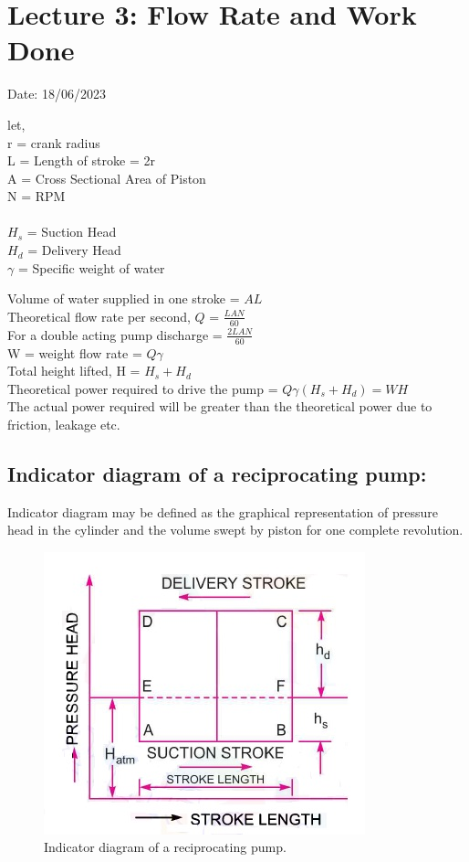 \documentclass{article}
\begin{document}
\section{Lecture 3: Flow Rate and Work Done}
\hfill Date: 18/06/2023

\begin{multicols}{2}
  let, \\
  r = crank radius \\
  L = Length of stroke = 2r \\ 
  A = Cross Sectional Area of Piston \\
  N = RPM \\
  \\
  $H_s$ = Suction Head \\
  $H_d$ = Delivery Head \\
  $\gamma$ = Specific weight of water \\
\end{multicols}

Volume of water supplied in one stroke = $AL$ \\
Theoretical flow rate per second, $Q$ = $\frac{LAN}{60}$ \\
For a double acting pump discharge = $\frac{2LAN}{60}$ \\
W = weight flow rate = $Q\gamma$ \\
Total height lifted, H = $H_s + H_d$ \\
Theoretical power required to drive the pump = $Q \gamma \left(H_s + H_d\right) = WH$\\
The actual power required will be greater than the theoretical power due to friction, leakage etc.

\subsection*{Indicator diagram of a reciprocating pump:}
Indicator diagram may be defined as the graphical representation of pressure head in the cylinder and the volume swept by piston for one complete revolution.  
\begin{figure}[h]
  \begin{center}
    \includegraphics[width=0.7\linewidth]{img/indicator_diagram.jpg}
    \caption{Indicator diagram of a reciprocating pump.}
  \end{center}
\end{figure}
\end{document}
